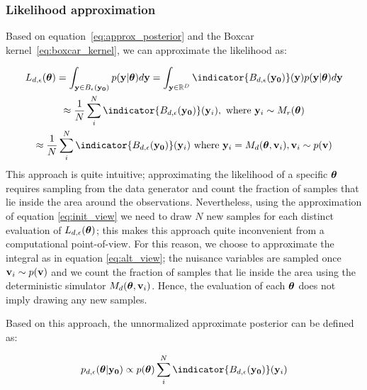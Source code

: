 \subsubsection*{Likelihood approximation}

Based on equation~\ref{eq:approx_posterior} and the Boxcar kernel~\ref{eq:boxcar_kernel}, we can approximate the likelihood as:

\begin{gather} \label{eq:approx_likelihood}
  L_{d, \epsilon}(\thetab) =
  \int_{\yb \in B_\epsilon(\data)}p(\yb|\thetab)d\yb =
  \int_{\yb \in \R^D} \indicator{\region(\data)}(\yb)p(\yb|\thetab)d\yb\\
  \approx \frac{1}{N} \sum_i^N \indicator{\region(\data)}(\yb_i),\text{ where }
  \yb_i \sim M_r(\thetab) \label{eq:init_view}\\
  \approx \frac{1}{N} \sum_i^N \indicator{\region (\data)} (\yb_i)
  \text{ where } \yb_i = M_d(\thetab, \vb_i), \vb_i \sim p(\vb) \label{eq:alt_view}
\end{gather}
%
This approach is quite intuitive; approximating the likelihood of a
specific $\boldsymbol{\theta}$ requires sampling from the data generator and count
the fraction of samples that lie inside the area around the
observations. Nevertheless, using the approximation of equation
\eqref{eq:init_view} we need to draw $N$ new samples for each distinct
evaluation of $L_{d,\epsilon}(\boldsymbol{\theta})$; this makes this approach
quite inconvenient from a computational point-of-view. For this
reason, we choose to approximate the integral as in equation
\eqref{eq:alt_view}; the nuisance variables are sampled once
$\mathbf{v}_i \sim p(\mathbf{v})$ and we count the fraction of samples that lie
inside the area using the deterministic simulator
$M_d(\boldsymbol{\theta}, \mathbf{v}_i)$. Hence, the evaluation of each $\boldsymbol{\theta}$ does
not imply drawing any new samples.

\noindent
Based on this approach, the unnormalized approximate posterior can be
defined as:

\begin{equation} \label{eq:aprox_posterior}
  p_{d,\epsilon}(\thetab|\data)
  \propto p(\thetab) \sum_i^N \indicator{ \region(\data)} (\yb_i)
\end{equation}

